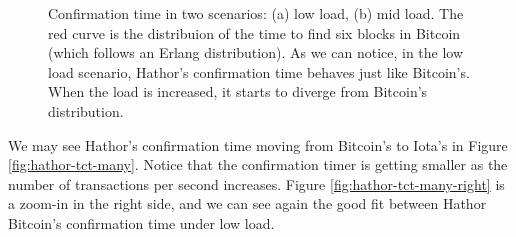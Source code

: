 \begin{figure}[!htb]
\centering
{}

\caption{Confirmation time in two scenarios: (a) low load, (b) mid load. The red curve is the distribuion of the time to find six blocks in Bitcoin (which follows an Erlang distribution). As we can notice, in the low load scenario, Hathor's confirmation time behaves just like Bitcoin's. When the load is increased, it starts to diverge from Bitcoin's distribution. \label{fig:hathor-tct-low-mid}}
\end{figure}

We may see Hathor's confirmation time moving from Bitcoin's to Iota's in Figure \ref{fig:hathor-tct-many}. Notice that the confirmation timer is getting smaller as the number of transactions per second increases. Figure \ref{fig:hathor-tct-many-right} is a zoom-in in the right side, and we can see again the good fit between Hathor Bitcoin's confirmation time under low load.

